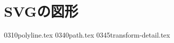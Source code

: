 \chapter{SVGの図形}
 \CH 0310polyline.tex
 \CH 0340path.tex
 \CH 0345transform-detail.tex
\iffalse
 \CH 0350pattern.tex
 \CH 0360image.tex
 \CH 0370mask.tex
\fi